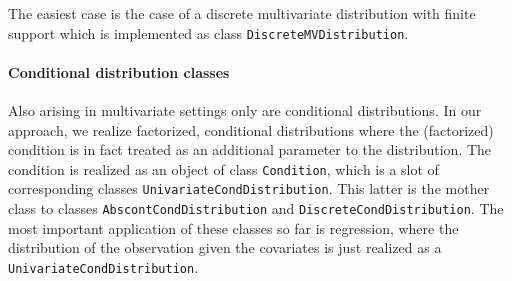 \documentclass[11pt]{article}
\newcommand{\code}[1]{{\tt #1}}
\begin{document}
The easiest case is the case of a discrete multivariate distribution with finite 
support which is implemented as class \code{DiscreteMVDistribution}.

\paragraph{Conditional distribution classes}

Also arising in multivariate settings only are conditional distributions. In our 
approach, we realize factorized, conditional distributions where the 
(factorized) condition is in fact treated as an additional parameter to the 
distribution. The condition is realized as an object of class \code{Condition}, 
which is a slot of corresponding classes \code{UnivariateCondDistribution}. 
This latter is the mother class to classes
\code{AbscontCondDistribution} and \code{DiscreteCondDistribution}.
The most important application of these classes so far is regression, where
the distribution of the observation given the covariates is just realized as
a \code{UnivariateCondDistribution}.
\end{document}

